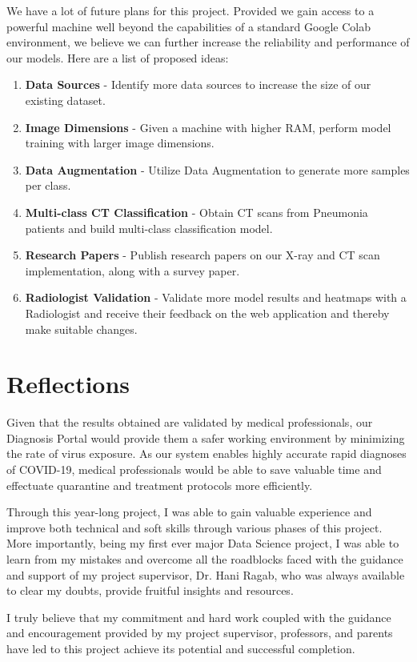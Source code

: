 We have a lot of future plans for this project. Provided we gain access to a powerful machine well beyond the capabilities of a standard Google Colab environment, we believe we can further increase the reliability and performance of our models. Here are a list of proposed ideas:
\begin{enumerate}
    \item \textbf{Data Sources} - Identify more data sources to increase the size of our existing dataset.
    \item \textbf{Image Dimensions} - Given a machine with higher RAM, perform model training with larger image dimensions.
    \item \textbf{Data Augmentation} - Utilize Data Augmentation to generate more samples per class.
    \item \textbf{Multi-class CT Classification} - Obtain CT scans from Pneumonia patients and build multi-class classification model.
    \item \textbf{Research Papers} - Publish research papers on our X-ray and CT scan implementation, along with a survey paper.
    \item \textbf{Radiologist Validation} - Validate more model results and heatmaps with a Radiologist and receive their feedback on the web application and thereby make suitable changes.
\end{enumerate}
\section{Reflections}

Given that the results obtained are validated by medical professionals, our Diagnosis Portal would provide them a safer working environment by minimizing the rate of virus exposure. As our system enables highly accurate rapid diagnoses of COVID-19, medical professionals would be able to save valuable time and effectuate quarantine and treatment protocols more efficiently.

Through this year-long project, I was able to gain valuable experience and improve both technical and soft skills through various phases of this project. More importantly, being my first ever major Data Science project, I was able to learn from my mistakes and overcome all the roadblocks faced with the guidance and support of my project supervisor, Dr. Hani Ragab, who was always available to clear my doubts, provide fruitful insights and resources. 

I truly believe that my commitment and hard work coupled with the guidance and encouragement provided by my project supervisor, professors, and parents have led to this project achieve its potential and successful completion.